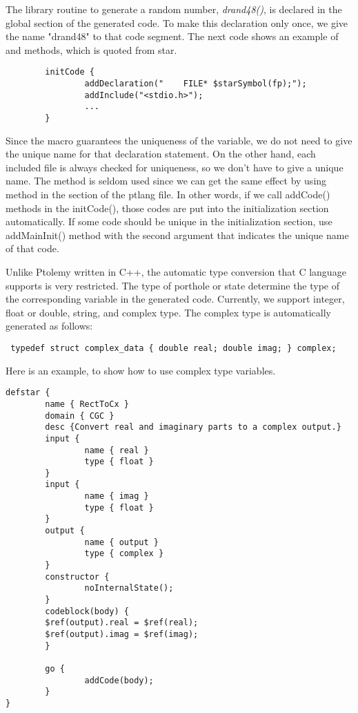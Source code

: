  The library routine to generate a random number, \emph{drand48()},
is declared in the global section of the generated code.
 To make this declaration only once, we give the name "drand48" to that
code segment.
 The next code shows an example of
and
methods, which is quoted from 
star.

\begin{verbatim}
        initCode {
                addDeclaration("    FILE* $starSymbol(fp);");
                addInclude("<stdio.h>");
                ...
        }
\end{verbatim}

 Since the
macro guarantees the uniqueness of the variable, we do not need to
give the unique name for that declaration statement.
 On the other hand, each included file is always checked for uniqueness,
so we don't have to give a unique name.
 The
method is seldom
used since we can get the same effect by using 
method in the
section of the ptlang file.
 In other words, if we call addCode() methods in the initCode(), those codes
are put into the initialization section automatically.
 If some code should be unique in the initialization section, use
addMainInit() method with the second argument that indicates the unique
name of that code.

 Unlike Ptolemy written in C++, the automatic  type conversion that C language supports is very restricted.
 The type of porthole or state determine the type of the
corresponding variable in the generated code.
 Currently, we support integer, float or double, string, and complex type.
 The complex type is automatically generated as follows:

\begin{verbatim}
 typedef struct complex_data { double real; double imag; } complex;
\end{verbatim}

Here is an example,
to show how to use complex type variables.

\begin{verbatim}
defstar {
        name { RectToCx }
        domain { CGC }
        desc {Convert real and imaginary parts to a complex output.}
        input {
                name { real }
                type { float }
        }
        input {
                name { imag }
                type { float }
        }
        output {
                name { output }
                type { complex }
        }
        constructor {
                noInternalState();
        }
        codeblock(body) {
        $ref(output).real = $ref(real);
        $ref(output).imag = $ref(imag);
        }
        
        go {
                addCode(body);
        }
}
\end{verbatim}

